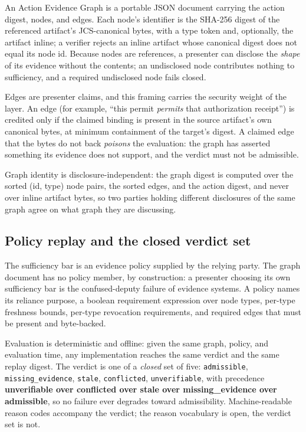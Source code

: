 \documentclass[11pt]{article}
\newcommand{\code}[1]{\texttt{#1}}
\begin{document}
An Action Evidence Graph is a portable JSON document carrying the action digest,
nodes, and edges. Each node's identifier is the SHA-256 digest of the referenced
artifact's JCS-canonical bytes, with a type token and, optionally, the artifact
inline; a verifier rejects an inline artifact whose canonical digest does not
equal its node id. Because nodes are references, a presenter can disclose the
\emph{shape} of its evidence without the contents; an undisclosed node contributes
nothing to sufficiency, and a required undisclosed node fails closed.

Edges are presenter claims, and this framing carries the security weight of the
layer. An edge (for example, ``this permit \emph{permits} that authorization
receipt'') is credited only if the claimed binding is present in the source
artifact's own canonical bytes, at minimum containment of the target's digest. A
claimed edge that the bytes do not back \emph{poisons} the evaluation: the graph
has asserted something its evidence does not support, and the verdict must not be
admissible.

Graph identity is disclosure-independent: the graph digest is computed over the
sorted (id, type) node pairs, the sorted edges, and the action digest, and never
over inline artifact bytes, so two parties holding different disclosures of the
same graph agree on what graph they are discussing.

\subsection{Policy replay and the closed verdict set}

The sufficiency bar is an evidence policy supplied by the relying party. The graph
document has no policy member, by construction: a presenter choosing its own
sufficiency bar is the confused-deputy failure of evidence systems. A policy names
its reliance purpose, a boolean requirement expression over node types, per-type
freshness bounds, per-type revocation requirements, and required edges that must be
present and byte-backed.

Evaluation is deterministic and offline: given the same graph, policy, and
evaluation time, any implementation reaches the same verdict and the same replay
digest. The verdict is one of a \emph{closed} set of five: \code{admissible},
\code{missing\_evidence}, \code{stale}, \code{conflicted}, \code{unverifiable},
with precedence \textbf{unverifiable over conflicted over stale over
missing\_evidence over admissible}, so no failure ever degrades toward
admissibility. Machine-readable reason codes accompany the verdict; the reason
vocabulary is open, the verdict set is not.
\end{document}
